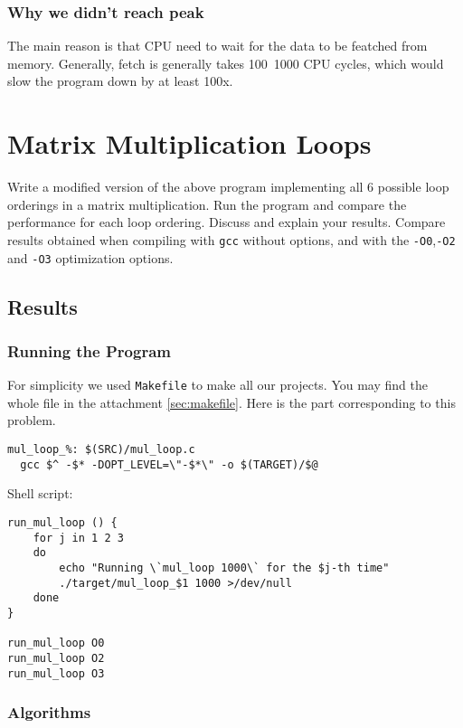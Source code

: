 \documentclass[12pt]{article}
\begin{document}
\subsubsection{Why we didn't reach peak}

The main reason is that CPU need to wait for the data to be featched from memory.
Generally, fetch is generally takes 100~1000 CPU cycles, which would slow the program down by at least 100x.

\section{Matrix Multiplication Loops}
Write a modified version of the above program implementing all 6 possible loop orderings in a matrix multiplication.
Run the program and compare the performance for each loop ordering. Discuss and explain your results.  Compare results obtained when compiling with \lstinline$gcc$ without options, and with the \lstinline$-O0$,\lstinline$-O2$ and \lstinline$-O3$ optimization options.

\subsection{Results}

\subsubsection{Running the Program}
For simplicity we used \texttt{Makefile} to make all our projects.
You may find the whole file in the attachment \autoref{sec:makefile}.
Here is the part corresponding to this problem.
\begin{lstlisting}
mul_loop_%: $(SRC)/mul_loop.c
  gcc $^ -$* -DOPT_LEVEL=\"-$*\" -o $(TARGET)/$@
\end{lstlisting}

Shell script:
\begin{lstlisting}
run_mul_loop () { 
    for j in 1 2 3
    do
        echo "Running \`mul_loop 1000\` for the $j-th time"
        ./target/mul_loop_$1 1000 >/dev/null
    done
}

run_mul_loop O0
run_mul_loop O2
run_mul_loop O3
\end{lstlisting}

\subsubsection{Algorithms}
\end{document}
